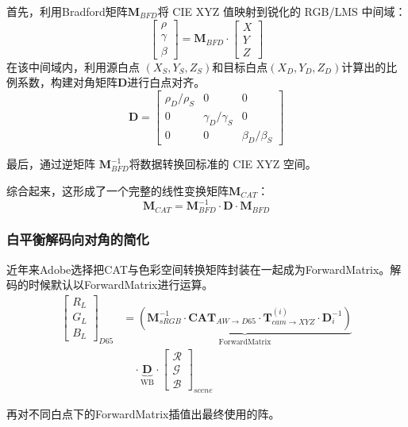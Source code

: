 \documentclass[journal]{IEEEtran}
\begin{document}
首先，利用Bradford矩阵$\mathbf{M}_{BFD}$将 CIE XYZ 值映射到锐化的 RGB/LMS 中间域：
\[
\begin{bmatrix} \rho \\ \gamma \\ \beta \end{bmatrix} = \mathbf{M}_{BFD} \cdot \begin{bmatrix} X \\ Y \\ Z \end{bmatrix}
\]
在该中间域内，利用源白点 $(X_S, Y_S, Z_S)$和目标白点$(X_D, Y_D, Z_D)$计算出的比例系数，构建对角矩阵$\mathbf{D}$进行白点对齐。
\[
\mathbf{D} = \begin{bmatrix} \rho_D/\rho_S & 0 & 0 \\ 0 & \gamma_D/\gamma_S & 0 \\ 0 & 0 & \beta_D/\beta_S \end{bmatrix}
\]


最后，通过逆矩阵 $\mathbf{M}_{BFD}^{-1}$将数据转换回标准的 CIE XYZ 空间。

综合起来，这形成了一个完整的线性变换矩阵$\mathbf{M}_{CAT}$：
\[
\mathbf{M}_{CAT} = \mathbf{M}_{BFD}^{-1} \cdot \mathbf{D} \cdot \mathbf{M}_{BFD}
\]

\subsubsection{白平衡解码向对角的简化}


近年来Adobe选择把CAT与色彩空间转换矩阵封装在一起成为ForwardMatrix。解码的时候默认以ForwardMatrix进行运算。
\[
\begin{aligned}
\begin{bmatrix} R_L \\ G_L \\ B_L \end{bmatrix}_{D65}
&= \underbrace{\left(\mathbf{M}_{sRGB}^{-1} \cdot \mathbf{CAT}_{AW \to D65} \cdot \mathbf{T}^{(i)}_{cam\to XYZ} \cdot \mathbf{D}_i^{-1}\right)}_{\text{ForwardMatrix}} \\
&\quad \cdot \underbrace{\mathbf{D}}_{\text{WB}} \cdot \begin{bmatrix} \mathcal{R} \\ \mathcal{G} \\ \mathcal{B} \end{bmatrix}_{scene}
\end{aligned}
\]


再对不同白点下的ForwardMatrix插值出最终使用的阵。 
\end{document}
